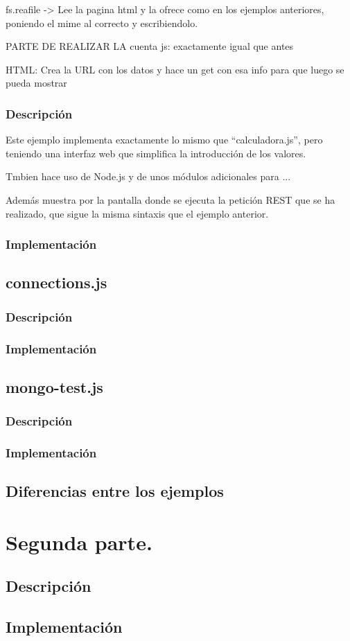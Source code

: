 \documentclass{article}
\begin{document}
fs.reafile -> Lee la pagina html y la ofrece como en los ejemplos anteriores, poniendo el mime al correcto y escribiendolo.

PARTE DE REALIZAR LA cuenta
js:
exactamente igual que antes

HTML:
Crea la URL con los datos y hace un get con esa info para que luego se pueda mostrar

\subsubsection{Descripción}
Este ejemplo implementa exactamente lo mismo que ``calculadora.js'', pero teniendo una interfaz web que simplifica la introducción de los valores.

Tmbien hace uso de Node.js y de unos módulos adicionales para ...



Además muestra por la pantalla donde se ejecuta la petición REST que se ha realizado, que sigue la misma sintaxis que el ejemplo anterior.

\subsubsection{Implementación}

\subsection{connections.js}
\subsubsection{Descripción}
\subsubsection{Implementación}

\subsection{mongo-test.js}
\subsubsection{Descripción}
\subsubsection{Implementación}

\subsection{Diferencias entre los ejemplos}

\section{Segunda parte.}
\subsection{Descripción}
\subsection{Implementación}
\end{document}
